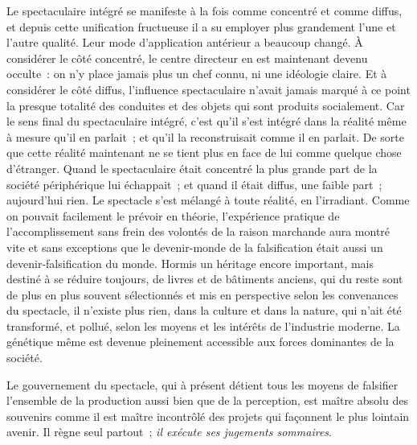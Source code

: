 \documentclass[french,twoside]{book} %
\begin{document}
Le spectaculaire intégré se manifeste à la fois comme concentré et comme diffus, et depuis cette unification fructueuse il a su employer plus grandement l’une et l’autre qualité. Leur mode d’application antérieur a beaucoup changé. À considérer le côté concentré, le centre directeur en est maintenant devenu occulte : on n’y place jamais plus un chef connu, ni une idéologie claire. Et à considérer le côté diffus, l’influence spectaculaire n’avait jamais marqué à ce point la presque totalité des conduites et des objets qui sont produits socialement. Car le sens final du spectaculaire intégré, c’est qu’il s’est intégré dans la réalité même à mesure qu’il en parlait ; et qu’il la reconstruisait comme il en parlait. De sorte que cette réalité maintenant ne se tient plus en face de lui comme quelque chose d’étranger. Quand le spectaculaire était concentré la plus grande part de la société périphérique lui échappait ; et quand il était diffus, une faible part ; aujourd’hui rien. Le spectacle s’est mélangé à toute réalité, en l’irradiant. Comme on pouvait facilement le prévoir en théorie, l’expérience pratique de l’accomplissement sans frein des volontés de la raison marchande aura montré vite et sans exceptions que le devenir-monde de la falsification était aussi un devenir-falsification du monde. Hormis un héritage encore important, mais destiné à se réduire toujours, de livres et de bâtiments anciens, qui du reste sont de plus en plus souvent sélectionnés et mis en perspective selon les convenances du spectacle, il n’existe plus rien, dans la culture et dans la nature, qui n’ait été transformé, et pollué, selon les moyens et les intérêts de l’industrie moderne. La génétique même est devenue pleinement accessible aux forces dominantes de la société.\par
Le gouvernement du spectacle, qui à présent détient tous les moyens de falsifier l’ensemble de la production aussi bien que de la perception, est maître absolu des souvenirs comme il est maître incontrôlé des projets qui façonnent le plus lointain avenir. Il règne seul partout ; \emph{il exécute ses jugements sommaires}.\par
\end{document}
